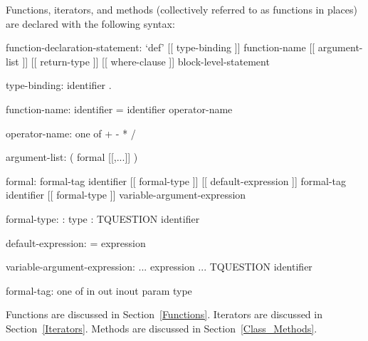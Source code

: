 Functions, iterators, and methods (collectively referred to as
functions in places) are declared with the following syntax:
\begin{syntax}
function-declaration-statement:
  `def' [[ type-binding ]] function-name [[ argument-list ]]
    [[ return-type ]] [[ where-clause ]] block-level-statement

type-binding:
  identifier .

function-name:
  identifier
  = identifier
  operator-name

operator-name: one of
  + - * / %

argument-list:
  ( formal [[,...]] )

formal:
  formal-tag identifier [[ formal-type ]] [[ default-expression ]]
  formal-tag identifier [[ formal-type ]] variable-argument-expression

formal-type:
  : type
  : TQUESTION identifier

default-expression:
  = expression

variable-argument-expression:
  ... expression
  ... TQUESTION identifier

formal-tag: one of
  in out inout param type
\end{syntax}
Functions are discussed in Section~\ref{Functions}.  Iterators are
discussed in Section~\ref{Iterators}.  Methods are discussed in
Section~\ref{Class_Methods}.
